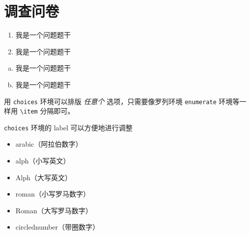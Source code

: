 
\appendix


\chapter{调查问卷}

\begin{enumerate}
  \item 我是一个问题题干
  \item 我是一个问题题干
\end{enumerate}

\begin{enumerate}[(a)]
  \item 我是一个问题题干
  \item 我是一个问题题干
\end{enumerate}

用 \verb|choices| 环境可以排版 \emph{任意个} 选项，只需要像罗列环境 \verb|enumerate| 环境等一样用 \verb|\item| 分隔即可。

\verb|choices| 环境的 label 可以方便地进行调整
\begin{itemize}
  \item arabic（阿拉伯数字）
  \item alph（小写英文）
  \item Alph（大写英文）
  \item roman（小写罗马数字）
  \item Roman（大写罗马数字）
  \item circlednumber（带圈数字）
\end{itemize}

